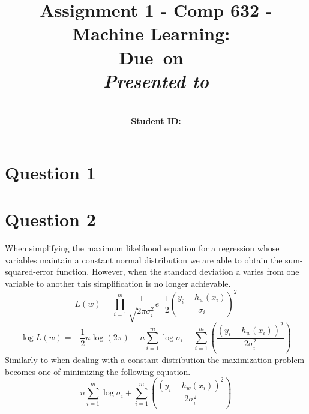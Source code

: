 \documentclass{report}
\title{Assignment 1 - Comp 632 - Machine Learning}
\title{\vspace{2in}\textmd{\textbf{\hmwkClass:\ \hmwkTitle}}\\\normalsize\vspace{0.1in}\small{Due\ on\ \hmwkDueDate}\\\vspace{0.1in}\large{\textit{Presented to \hmwkClassInstructor}}\vspace{3in}}
\date{}
\author{\textbf{\hmwkAuthorName}\\
    \textbf{Student ID: \hmwkAuthorNumber}}
\begin{document}
\maketitle
\section*{Question 1}
\section*{Question 2}
When simplifying the maximum likelihood equation for a regression whose variables
maintain a constant normal distribution we are able to obtain the sum-squared-error
function. However, when the standard deviation a varies from one variable to another
this simplification is no longer achievable.
  \begin{equation}
     L(w) = \prod_{i=1}^{m} \frac{1}{\sqrt{2\pi\sigma_i^2}}e^-\frac{1}{2}\left(\frac{y_i-h_w(x_i)}{\sigma_i}\right)^2
  \end{equation}
  \begin{equation}
     \log L(w) = -\frac{1}{2}n \log(2\pi) - n \sum_{i=1}^{m} \log \sigma_i - \sum_{i=1}^{m} \left(\frac{(y_i-h_w(x_i))^2}{2\sigma_i^2}\right)
  \end{equation}
Similarly to when dealing with a constant distribution the maximization problem
becomes one of minimizing the following equation.
\begin{equation}
     n \sum_{i=1}^{m} \log \sigma_i + \sum_{i=1}^{m} \left(\frac{(y_i-h_w(x_i))^2}{2\sigma_i^2}\right)
\end{equation}
\end{document}
